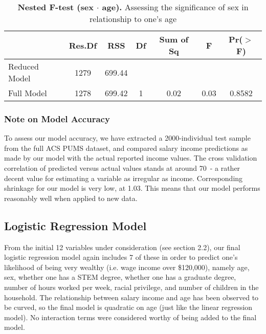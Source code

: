 \documentclass{article}
\newcommand*\pct{\scalebox{.85}{\%}}
\begin{document}
\begin{table}[h]
\centering
\begin{tabular}{lcccccc}
  \toprule
  & Res.Df & RSS & Df & Sum of Sq & F & Pr($>$F) \\ 
  \midrule
  Reduced Model & 1279 & 699.44 &  &  &  &  \\ 
  Full Model & 1278 & 699.42 & 1 & 0.02 & 0.03 & 0.8582 \\ 
  \bottomrule
\end{tabular}
\caption{\textbf{Nested F-test (sex $\cdot$ age).} Assessing the significance of sex in relationship to one's age}
\label{f_test_3}
\end{table}

\subsubsection{Note on Model Accuracy}

To assess our model accuracy, we have extracted a 2000-individual test sample from the full ACS PUMS dataset, and compared salary income predictions as made by our model with the actual reported income values. The cross validation correlation of predicted versus actual values stands at around 70\pct\, - a rather decent value for estimating a variable as irregular as income. Corresponding shrinkage for our model is very low, at 1.03\pct. This means that our model performs reasonably well when applied to new data.

\subsection{Logistic Regression Model}

From the initial 12 variables under consideration (see section 2.2), our final logistic regression model again includes 7 of these in order to predict one's likelihood of being very wealthy (i.e. wage income over \$120,000), namely age, sex, whether one has a STEM degree, whether one has a graduate degree, number of hours worked per week, racial privilege, and number of children in the household. The relationship between salary income and age has been observed to be curved, so the final model is quadratic on age (just like the linear regression model). No interaction terms were considered worthy of being added to the final model.
\end{document}
